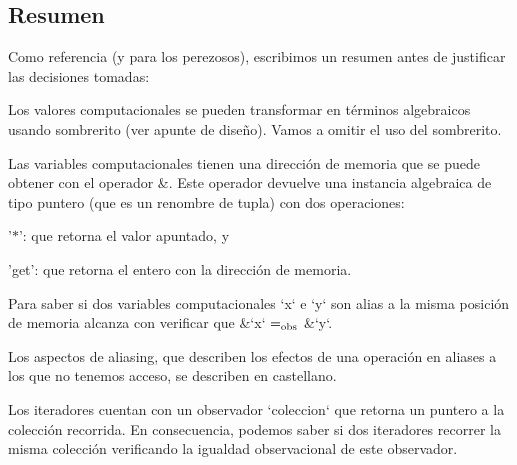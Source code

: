 \hypertarget{Aliasing_sec-Resumen}{}\subsection{\-Resumen}\label{Aliasing_sec-Resumen}
\-Como referencia (y para los perezosos), escribimos un resumen antes de justificar las decisiones tomadas\-:
\begin{DoxyItemize}
\item \-Los valores computacionales se pueden transformar en términos algebraicos usando sombrerito (ver apunte de diseño). \-Vamos a omitir el uso del sombrerito.
\item \-Las variables computacionales tienen una dirección de memoria que se puede obtener con el operador \&. \-Este operador devuelve una instancia algebraica de tipo puntero (que es un renombre de tupla) con dos operaciones\-:
\begin{DoxyEnumerate}
\item '$\ast$'\-: que retorna el valor apuntado, y
\item 'get'\-: que retorna el entero con la dirección de memoria.
\end{DoxyEnumerate}
\item \-Para saber si dos variables computacionales `x` e `y` son alias a la misma posición de memoria alcanza con verificar que \&`x` $=_{\rm obs}$ \&`y`.
\item \-Los aspectos de aliasing, que describen los efectos de una operación en aliases a los que no tenemos acceso, se describen en castellano.
\item \-Los iteradores cuentan con un observador `coleccion` que retorna un puntero a la colección recorrida. \-En consecuencia, podemos saber si dos iteradores recorrer la misma colección verificando la igualdad observacional de este observador.
\end{DoxyItemize}

